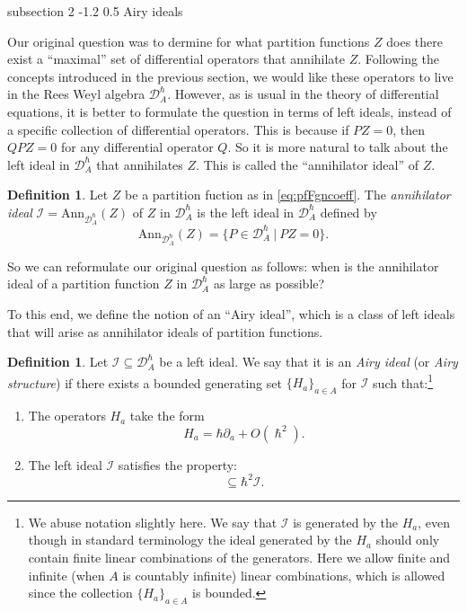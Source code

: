 \documentclass[reqno,oneside,11pt]{amsart}
\makeatletter
\theoremstyle{plain}
\theoremstyle{definition}
\newtheorem{definition}[theorem]{Definition}
\theoremstyle{remark}
\numberwithin{equation}{section}
\renewcommand{\subsection}{\@startsection
{subsection}%
{2}%
{\z@}%
{-1.2\baselineskip}%
{0.5\baselineskip}%
{\normalfont \bf \normalsize}} %
\newcommand{\DAh}{\mathcal{D}_A^{\hbar}}
\makeatother
\begin{document}
\subsection{Airy ideals}

Our original question was to dermine for what partition functions $Z$ does there exist a ``maximal'' set of differential operators that annihilate $Z$. Following the concepts introduced in the previous section, we would like these operators to live in the Rees Weyl algebra $\DAh$. However, as is usual in the theory of differential equations, it is better to formulate the question in terms of left ideals, instead of a specific collection of differential operators. This is because if $P Z =0$, then $Q P Z = 0$ for any differential operator $Q$. So it is more natural to talk about the left ideal in $\DAh$ that annihilates $Z$. This is called the ``annihilator ideal'' of $Z$.

\begin{definition}
Let $Z$ be a partition fuction as in \eqref{eq:pfFgncoeff}. The \emph{annihilator ideal} $\mathcal{I} = \text{Ann}_{\DAh}(Z)$ of $Z$ in $\DAh$ is the left ideal in $\DAh$ defined by
\begin{equation}
 \text{Ann}_{\DAh}(Z) = \{ P \in \DAh~|~ P Z = 0 \}. 
\end{equation}
\end{definition}

So we can reformulate our  original question as follows: when is the annihilator ideal of a partition function $Z$ in $\DAh$ as large as possible?

To this end, we define the notion of an ``Airy ideal'', which is a class of left ideals that will arise as annihilator ideals of partition functions.


 \begin{definition}\label{d:airy}
 Let $\mathcal{I} \subseteq \DAh$ be a left ideal. We say that it is an \emph{Airy ideal} (or \emph{Airy structure}) if there exists a bounded generating set $\{H_a \}_{a \in A}$ for $\mathcal{I}$ such that:\footnote{We abuse notation slightly here. We say that $\mathcal{I}$ is generated by the $H_a$, even though in standard terminology the ideal generated by the $H_a$ should only contain finite linear combinations of the generators. Here we allow finite and infinite (when $A$ is countably infinite) linear combinations, which is allowed since the collection $\{H_a \}_{a \in A}$ is bounded.}
  \begin{enumerate}
    \item The operators $H_a$ take the form
    \begin{equation}\label{eq:form}
       H_a= \hbar \partial_a + O(\hslash^2).
    \end{equation}
    \item The left ideal $\mathcal{I}$ satisfies the property:
    \begin{equation}
      [ \mathcal{I}, \mathcal{I}] \subseteq \hbar^2 \mathcal{I}.
    \end{equation}
  \end{enumerate}
 \end{definition}    
 
\end{document}
